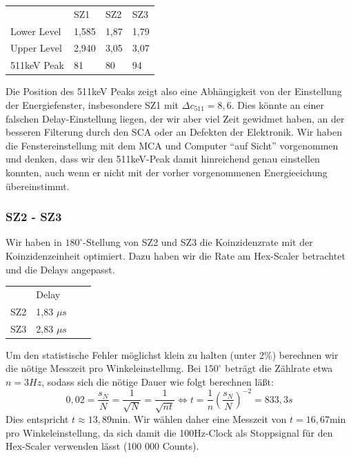 \begin{center}
\begin{tabular}{llll}
 & SZ1 & SZ2 & SZ3\\
Lower Level & 1,585 & 1,87 & 1,79\\
Upper Level & 2,940 & 3,05 & 3,07\\
511keV Peak & 81  & 80 & 94
\end{tabular}
\end{center}

Die Position des 511keV Peaks zeigt also eine Abhängigkeit von der Einstellung der Energiefenster, insbesondere SZ1 mit $\Delta c_{511} = 8,6$. Dies könnte an einer falschen Delay-Einstellung liegen, der wir aber viel Zeit gewidmet haben, an der besseren Filterung durch den SCA oder an Defekten der Elektronik. Wir haben die Fenstereinstellung mit dem MCA und Computer "`auf Sicht"' vorgenommen und denken, dass wir den 511keV-Peak damit hinreichend genau einstellen konnten, auch wenn er nicht mit der vorher vorgenommenen Energieeichung übereinstimmt.

\subsubsection{SZ2 - SZ3}

Wir haben in $180^\circ$-Stellung von SZ2 und SZ3 die Koinzidenzrate mit der Koinzidenzeinheit optimiert. Dazu haben wir die Rate am Hex-Scaler betrachtet und die Delays angepasst.

\begin{center}
\begin{tabular}{llll}
 & Delay\\
SZ2 & 1,83 $\mu s$\\
SZ3 & 2,83 $\mu s$
\end{tabular}
\end{center}

Um den statistische Fehler möglichst klein zu halten (unter 2\%) berechnen wir die nötige Messzeit pro Winkeleinstellung. Bei $150^\circ$ beträgt die Zählrate etwa $n = 3 Hz$, sodass sich die nötige Dauer wie folgt berechnen läßt:
\begin{equation}
 0,02 = \frac{s_N}{N} = \frac{1}{\sqrt{N}} = \frac{1}{\sqrt{n t}} \Leftrightarrow t = \frac{1}{n}\left( \frac{s_N}{N} \right)^{-2} = 833,3s
\end{equation}
Dies entspricht $t \approx 13,89 \text{min}$. Wir wählen daher eine Messzeit von $t = 16,67 \text{min}$ pro Winkeleinstellung, da sich damit die 100Hz-Clock als Stoppsignal für den Hex-Scaler verwenden lässt (100 000 Counts). 

